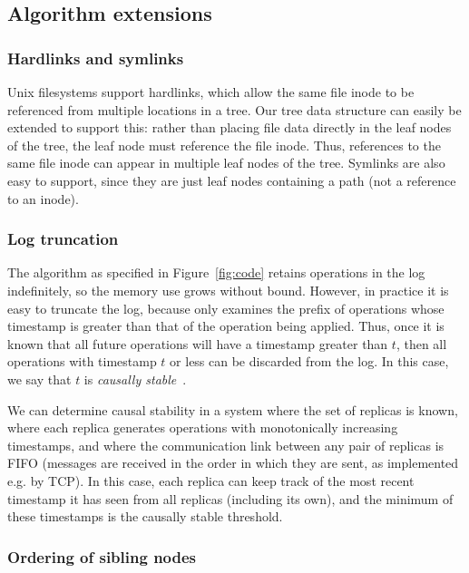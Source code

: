 \documentclass[sigconf]{acmart}
\begin{document}
\subsection{Algorithm extensions}\label{sec:extensions}

\subsubsection{Hardlinks and symlinks}\label{sec:hardlinks}

Unix filesystems support hardlinks, which allow the same file inode to be referenced from multiple locations in a tree.
Our tree data structure can easily be extended to support this: rather than placing file data directly in the leaf nodes of the tree, the leaf node must reference the file inode.
Thus, references to the same file inode can appear in multiple leaf nodes of the tree.
Symlinks are also easy to support, since they are just leaf nodes containing a path (not a reference to an inode).

\subsubsection{Log truncation}\label{sec:log-truncation}

The algorithm as specified in Figure~\ref{fig:code} retains operations in the log indefinitely, so the memory use grows without bound.
However, in practice it is easy to truncate the log, because  only examines the prefix of operations whose timestamp is greater than that of the operation being applied.
Thus, once it is known that all future operations will have a timestamp greater than $t$, then all operations with timestamp $t$ or less can be discarded from the log.
In this case, we say that $t$ is \emph{causally stable}~\cite{Baquero:2014ed}.

We can determine causal stability in a system where the set of replicas is known, where each replica generates operations with monotonically increasing timestamps, and where the communication link between any pair of replicas is FIFO (messages are received in the order in which they are sent, as implemented e.g. by TCP).
In this case, each replica can keep track of the most recent timestamp it has seen from all replicas (including its own), and the minimum of these timestamps is the causally stable threshold.

\subsubsection{Ordering of sibling nodes}\label{sec:ordering}
\end{document}
